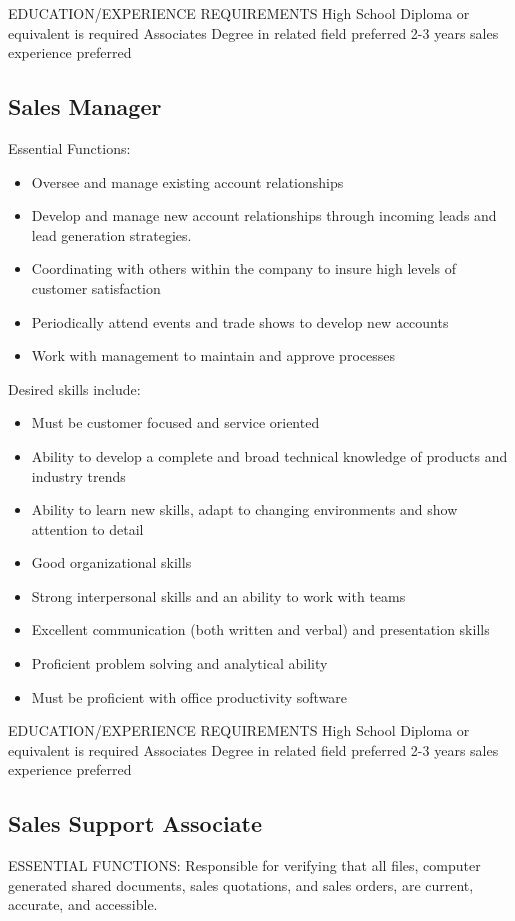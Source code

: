 EDUCATION/EXPERIENCE REQUIREMENTS
High School Diploma or equivalent is required
Associates Degree in related field preferred
2-3 years sales experience preferred

\subsection{Sales Manager}
Essential Functions:
\begin{itemize}
 \item Oversee and manage existing account relationships
 \item Develop and manage new account relationships through incoming leads and lead generation strategies.
 \item Coordinating with others within the company to insure high levels of customer satisfaction
 \item Periodically attend events and trade shows to develop new accounts
 \item Work with management to maintain and approve processes
\end{itemize}

Desired skills include:
\begin{itemize}
 \item Must be customer focused and service oriented
 \item Ability to develop a complete and broad technical knowledge of products and industry trends
 \item Ability to learn new skills, adapt to changing environments and show attention to detail
 \item Good organizational skills
 \item Strong interpersonal skills and an ability to work with teams
 \item Excellent communication (both written and verbal) and presentation skills
 \item Proficient problem solving and analytical ability
 \item Must be proficient with office productivity software
\end{itemize}

EDUCATION/EXPERIENCE REQUIREMENTS
High School Diploma or equivalent is required
Associates Degree in related field preferred
2-3 years sales experience preferred

\subsection{Sales Support Associate}
ESSENTIAL FUNCTIONS:
Responsible for verifying that all files, computer generated shared documents, sales quotations, and sales orders, are current, accurate, and accessible.

